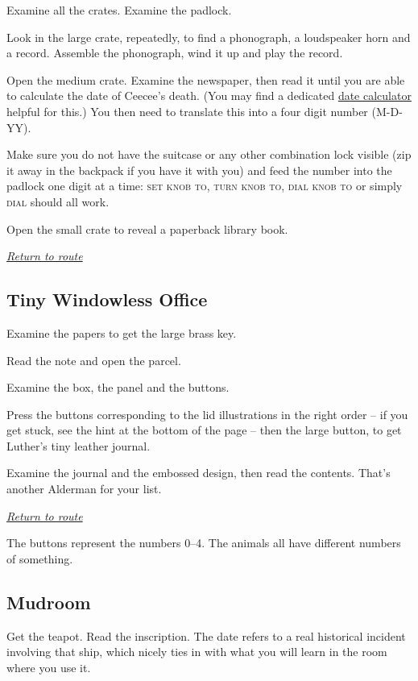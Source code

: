 \documentclass[a5paper]{extarticle}
\begin{document}
Examine all the crates. Examine the padlock.

Look in the large crate, repeatedly, to find a phonograph, a loudspeaker horn
and a record. Assemble the phonograph, wind it up and play the record.

Open the medium crate. Examine the newspaper, then read it until you are able to
calculate the date of Ceecee's death. (You may find a dedicated \href{https://www.timeanddate.com/date/dateadd.html}{date calculator} helpful for this.)
You then need to translate this into a four digit number (M-D-YY).

Make sure you do not have the suitcase or any other combination lock visible
(zip it away in the backpack if you have it with you)
and feed the number into the padlock one digit at a time:
\textsc{set knob to}, \textsc{turn knob to}, \textsc{dial knob to} or simply
\textsc{dial} should all work.

Open the small crate to reveal a paperback library book.

\hyperref[sec:route-4]{\emph{Return to route}}

\newpage
\subsection{Tiny Windowless Office}\label{sec:sol-Tiny-Windowless-Office}

Examine the papers to get the large brass key.

Read the note and open the parcel.

Examine the box, the panel and the buttons.

Press the buttons corresponding to the lid illustrations in the right order
-- if you get stuck, see the hint at the bottom of the page --
then the large button, to get Luther's tiny leather journal.

Examine the journal and the embossed design, then read the contents.
That's another Alderman for your list.

\hyperref[sec:route-4]{\emph{Return to route}}

\vfill

The buttons represent the numbers 0--4.
The animals all have different numbers of something.

\newpage
\subsection{Mudroom}\label{sec:sol-Mudroom}

Get the teapot. Read the inscription. The date refers to a real historical incident involving
that ship, which nicely ties in with what you will learn in the room where you use it.
\end{document}
